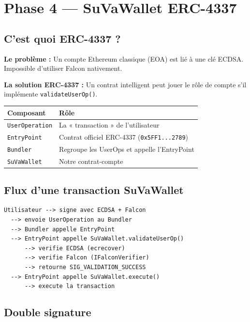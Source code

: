 \documentclass[11pt,a4paper]{article}
\begin{document}
\section{Phase 4 --- SuVaWallet ERC-4337}

\subsection{C'est quoi ERC-4337 ?}

\textbf{Le problème :} Un compte Ethereum classique (EOA) est lié à une clé ECDSA. Impossible d'utiliser Falcon nativement.

\textbf{La solution ERC-4337 :} Un contrat intelligent peut jouer le rôle de compte s'il implémente \texttt{validateUserOp()}.

\begin{center}
\begin{tabular}{ll}
\toprule
\textbf{Composant} & \textbf{Rôle} \\
\midrule
\texttt{UserOperation} & La « transaction » de l'utilisateur \\
\texttt{EntryPoint} & Contrat officiel ERC-4337 (\texttt{0x5FF1...2789}) \\
\texttt{Bundler} & Regroupe les UserOps et appelle l'EntryPoint \\
\texttt{SuVaWallet} & Notre contrat-compte \\
\bottomrule
\end{tabular}
\end{center}

\subsection{Flux d'une transaction SuVaWallet}

\begin{lstlisting}
Utilisateur --> signe avec ECDSA + Falcon
  --> envoie UserOperation au Bundler
  --> Bundler appelle EntryPoint
  --> EntryPoint appelle SuVaWallet.validateUserOp()
      --> verifie ECDSA (ecrecover)
      --> verifie Falcon (IFalconVerifier)
      --> retourne SIG_VALIDATION_SUCCESS
  --> EntryPoint appelle SuVaWallet.execute()
      --> execute la transaction
\end{lstlisting}

\subsection{Double signature}
\end{document}
